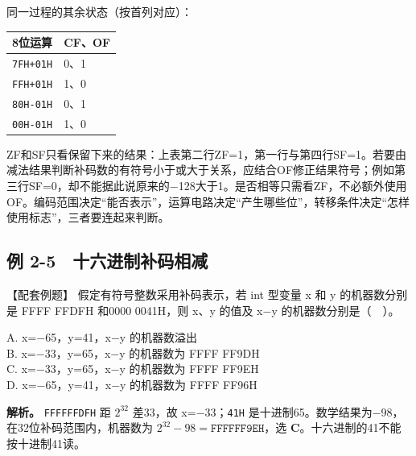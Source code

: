 同一过程的其余状态（按首列对应）：

\par\medskip\noindent\begin{minipage}{\linewidth}\fontsize{9.3}{12}\selectfont\begin{tabularx}{\linewidth}{@{}YY@{}}
\toprule\noalign{}
8位运算 & CF、OF \\
\midrule\noalign{}


\texttt{7FH+\allowbreak{}01H} & 0、1 \\
\texttt{FFH+\allowbreak{}01H} & 1、0 \\
\texttt{80H-01H} & 0、1 \\
\texttt{00H-01H} & 1、0 \\
\bottomrule\end{tabularx}
\end{minipage}\par\medskip

ZF和SF只看保留下来的结果：上表第二行ZF=1，第一行与第四行SF=1。若要由减法结果判断补码数的有符号小于或大于关系，应结合OF修正结果符号；例如第三行SF=0，却不能据此说原来的\ensuremath{-}128大于1。是否相等只需看ZF，不必额外使用OF。编码范围决定“能否表示”，运算电路决定“产生哪些位”，转移条件决定“怎样使用标志”，三者要连起来判断。

\subsection{例 2-5　十六进制补码相减}\label{CO02-13}

\begin{example}[配套例题]

【配套例题】 假定有符号整数采用补码表示，若 int 型变量 x 和 y 的机器数分别是 FFFF FFDFH 和0000 0041H，则 x、y 的值及 x\ensuremath{-}y 的机器数分别是（　）。

A. x=\ensuremath{-}65，y=41，x\ensuremath{-}y 的机器数溢出\\
B. x=\ensuremath{-}33，y=65，x\ensuremath{-}y 的机器数为 FFFF FF9DH\\
C. x=\ensuremath{-}33，y=65，x\ensuremath{-}y 的机器数为 FFFF FF9EH\\
D. x=\ensuremath{-}65，y=41，x\ensuremath{-}y 的机器数为 FFFF FF96H

\end{example}

\textbf{解析。} \texttt{FFFFFFDFH} 距 \(2^{32}\) 差33，故 x=\ensuremath{-}33；\texttt{41H} 是十进制65。数学结果为\ensuremath{-}98，在32位补码范围内，机器数为 \(2^{32}-98=\mathtt{FFFFFF9EH}\)，选 \textbf{C}。十六进制的41不能按十进制41读。

